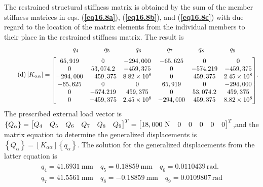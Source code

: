 \documentclass{AeroStructure-ERJohnson}
\begin{document}
\begin{example}
The restrained structural stiffness matrix is obtained by the sum of the member stiffness matrices in eqs. (\textbf{\ref{eq16.8a}}), (\textbf{\ref{eq16.8b}}), and (\textbf{\ref{eq16.8c}}) with due regard to the location of the matrix elements from the individual members to their place in the restrained stiffness matrix. The result is
\begin{align}\label{eq16.8d}\tag{d}
\left[K_{\alpha \alpha}\right]=\begin{array}{@{}c@{}}
{\arraycolsep=20pt\begin{array}{@{}cccccc@{}}
q_4 & q_5 & q_6 & q_7 & q_8 & q_9
\end{array}}\\[6pt]
\left[\begin{array}{@{}cccccc@{}}65,919 & 0 & -294,000 & -65,625 & 0 & 0 \\0 & 53,074.2 & -459,375 & 0 & -574.219 & -459,375 \\-294,000 & -459,375 & 8.82 \times 10^{8} & 0 & 459,375 & 2.45 \times 10^{8} \\-65,625 & 0 & 0 & 65,919 & 0 & -294,000 \\0 & -574.219 & 459,375 & 0 & 53,074.2 & 459,375 \\0 & -459,375 & 2.45 \times 10^{8} & -294,000 & 459,375 & 8.82 \times 10^{8}\end{array}\right]\end{array}.
\end{align}
The prescribed external load vector is $\left\{Q_{\alpha}\right\}=\left[\begin{array}{@{}llllll@{}}
Q_{4} & Q_{5} & Q_{6} & Q_{7} & Q_{8} & Q_{9}\end{array}\right]^{T}=\left[\begin{array}{@{}l@{\;\;\,\,\,}l@{\;\;\,\,\,}l@{\;\;\,\,\,}l@{\;\;\,\,\,}l@{\;\;\,\,\,}l@{}}18,000 \mathrm{~N} & 0 & 0 & 0 & 0 & 0\end{array}\right]^{T}$,\break and the matrix equation to determine the generalized displacements is $\left\{Q_{\alpha}\right\}=\left[K_{\alpha \alpha}\right]\left\{q_{\alpha}\right\}$. The solution for the generalized displacements from the latter equation is
\begin{align}\label{eq16.8e}\tag{e}
\begin{split}
q_{4}=41.6931 \mathrm{~mm} \quad q_{5}=0.18859 \mathrm{~mm} \quad q_{6}=0.0110439\, \mathrm{rad} \text {. }\\
q_{7}=41.5561 \mathrm{~mm} \quad q_{8}=-0.18859 \mathrm{~mm} \quad q_{9}=0.0109807\, \mathrm{rad}

\end{split}
\end{align}
\end{example}
\end{document}
